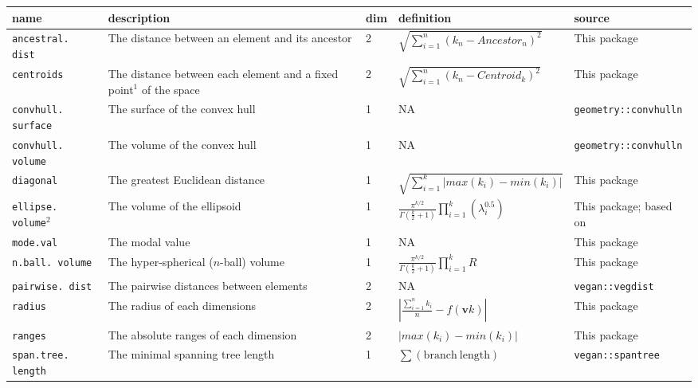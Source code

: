 \documentclass[12pt,letterpaper]{article}
\begin{document}
\begin{table}
\resizebox{\textwidth}{!}
{%
    \begin{tabular}{p{2cm}|p{5cm}|p{1cm}|p{5cm}|p{5cm}}
        \textbf{name} & \textbf{description} & \textbf{dim} & \textbf{definition} & \textbf{source} \\
        \hline
        \texttt{ancestral. dist} & The distance between an element and its ancestor & 2 & $\sqrt{\sum_{i=1}^{n}{({k}_{n}-Ancestor_{n})^2}}$ & This package \\
        \hline
        \texttt{centroids} & The distance between each element and a fixed point$^1$ of the space & 2 & $\sqrt{\sum_{i=1}^{n}{({k}_{n}-Centroid_{k})^2}}$ & This package \\
        \hline
        \texttt{convhull. surface} & The surface of the convex hull & 1 & NA & \texttt{geometry::convhulln} \citep{barber1996quickhull,geometryR}\\
        \hline
        \texttt{convhull. volume} & The volume of the convex hull & 1 & NA & \texttt{geometry::convhulln} \citep{barber1996quickhull,geometryR}\\
        \hline
        \texttt{diagonal} & The greatest Euclidean distance & 1 & $\sqrt{\sum_{i=1}^{k}|max(k_i) - min(k_i)|}$ & This package \\
        \hline
        \texttt{ellipse. volume}$^2$ & The volume of the ellipsoid & 1 & $\frac{\pi^{k/2}}{\Gamma(\frac{k}{2}+1)}\displaystyle\prod_{i=1}^{k} (\lambda_{i}^{0.5})$ & This package; based on \cite{DonohueDim}\\
        \hline
        \texttt{mode.val} & The modal value & 1 & NA & This package\\
        \hline
        \texttt{n.ball. volume} & The hyper-spherical ($n$-ball) volume & 1 & $\frac{\pi^{k/2}}{\Gamma(\frac{k}{2}+1)}\displaystyle\prod_{i=1}^{k} R$ & This package\\
        \hline
        \texttt{pairwise. dist} & The pairwise distances between elements & 2 & NA & \texttt{vegan::vegdist} \citep{oksanen2007vegan}\\        
        \hline
        \texttt{radius} & The radius of each dimensions & 2 & $|\frac{\sum_{i=1}^{n}k_i}{n} - f(\mathbf{v}k)|$ & This package\\
        \hline
        \texttt{ranges} & The absolute ranges of each dimension & 2 & $|max(k_i) - min(k_i)|$ & This package \\
        \hline
        \texttt{span.tree. length} & The minimal spanning tree length & 1 & $\sum(\mathrm{branch\ length})$ & \texttt{vegan::spantree} \citep{oksanen2007vegan}\\

\end{tabular}}
\end{table}
\end{document}
